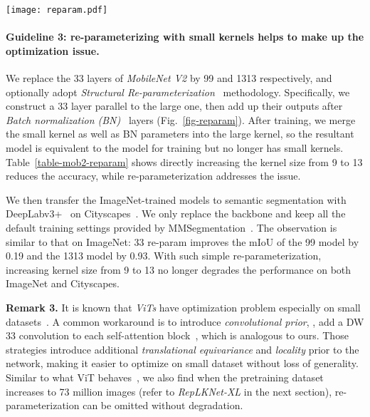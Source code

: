 \documentclass[10pt,twocolumn,letterpaper]{article}
\begin{document}
	\begin{figure*}
		\begin{center}
			\texttt{[image: reparam.pdf]}
			\vspace{-0.25in}
			\caption{An example of re-parameterizing a small kernel (\eg, 33) into a large one (\eg, 77). See \cite{ding2019acnet,ding2021repvgg} for details. }
			\label{fig-reparam}
			\vspace{-0.25in}
		\end{center}
	\end{figure*}
	
	\vspace{-0.15in} \paragraph{Guideline 3: re-parameterizing \cite{ding2021repvgg} with small kernels helps to make up the optimization issue.} We replace the 33 layers of \emph{MobileNet V2} by 99 and 1313 respectively, and optionally adopt \emph{Structural Re-parameterization}~\cite{ding2021repvgg,ding2021repmlpnet,ding2019acnet} methodology. Specifically, we construct a 33 layer parallel to the large one, then add up their outputs after \emph{Batch normalization (BN)}~\cite{ioffe2015batch} layers (Fig.~\ref{fig-reparam}). After training, we merge the small kernel as well as BN parameters into the large kernel, so the resultant model is equivalent to the model for training but no longer has small kernels. Table~\ref{table-mob2-reparam} shows directly increasing the kernel size from 9 to 13 reduces the accuracy, while re-parameterization addresses the issue. 
	
	We then transfer the ImageNet-trained models to semantic segmentation with DeepLabv3+~\cite{chen2018encoder} on Cityscapes~\cite{cityscapes}. We only replace the backbone and keep all the default training settings provided by MMSegmentation~\cite{mmseg2020}. The observation is similar to that on ImageNet: 33 re-param improves the mIoU of the 99 model by 0.19 and the 1313 model by 0.93. With such simple re-parameterization, increasing kernel size from 9 to 13 no longer degrades the performance on both ImageNet and Cityscapes. 
	
	\noindent\textbf{Remark 3.} 
	It is known that \emph{ViTs} have optimization problem especially on small datasets~\cite{vit,liu2020understanding}. A common workaround is to introduce \emph{convolutional prior}, \eg, add a DW 33 convolution to each self-attention block~\cite{wu2021cvt,chu2021conditional}, which is analogous to ours. Those strategies introduce additional \emph{translational equivariance} and \emph{locality} prior to the network, making it easier to optimize on small dataset without loss of generality. Similar to what ViT behaves~\cite{vit}, we also find when the pretraining dataset increases to 73 million images (refer to \emph{RepLKNet-XL} in the next section), re-parameterization can be omitted without degradation. 
	
\end{document}

